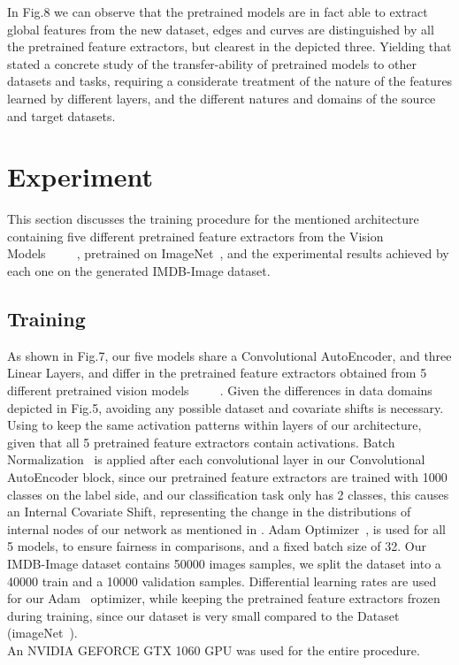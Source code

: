 \documentclass[conference]{IEEEtran}
\begin{document}
In Fig.8 we can observe that the pretrained models are in fact able to extract global features from the new dataset, edges and curves are distinguished by all the pretrained feature extractors, but clearest in the depicted three. Yielding that \cite{howtransferable} stated a concrete study of the transfer-ability of 
pretrained models to other datasets and tasks, requiring a considerate treatment of the nature of the features learned by different layers, and the different natures and domains of the source and target datasets.

\section{Experiment}
This section discusses the training procedure for the mentioned architecture containing five different pretrained feature extractors from the Vision Models~\cite{alexnet}~\cite{shufflenetv2}~\cite{vgg16}~\cite{resnet}~\cite{resnext}, pretrained on ImageNet~\cite{imagenet}, and the experimental results achieved by each one on the generated IMDB-Image dataset.




\subsection{Training}
            As shown in Fig.7, our five models share a Convolutional AutoEncoder, and three Linear Layers, and differ in the pretrained feature extractors obtained from 5 different pretrained vision models~\cite{alexnet}~\cite{shufflenetv2}~\cite{vgg16}~\cite{resnet}~\cite{resnext}. Given the differences in data domains depicted in Fig.5, avoiding any possible dataset and covariate shifts is necessary. Using  to keep the same activation patterns within layers of our architecture, given that all 5 pretrained feature extractors contain  activations. Batch Normalization~\cite{batchnorm} is applied after each convolutional layer in our Convolutional AutoEncoder block, since our pretrained feature extractors are trained with 1000 classes on the label side, and our classification task only has 2 classes, this causes an Internal Covariate Shift, representing the change in the distributions of internal nodes of our network as mentioned in \cite{batchnorm}. Adam Optimizer~\cite{Adam}, is used for all 5 models, to ensure fairness in comparisons, and a fixed batch size of 32. Our IMDB-Image dataset contains 50000 images samples,
            we split the dataset into a 40000 train and a 10000 validation samples. Differential learning rates are used for our Adam~\cite{Adam} optimizer, while keeping the pretrained feature extractors frozen during training, since our dataset is very small compared to the  Dataset (imageNet~\cite{imagenet}).\\
			An NVIDIA GEFORCE GTX 1060 GPU was used for the entire procedure. 
\end{document}
